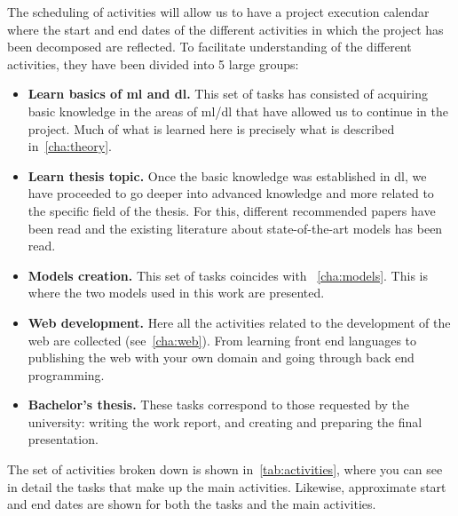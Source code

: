 The scheduling of activities will allow us to have a project execution calendar
where the start and end dates of the different activities in which the project
has been decomposed are reflected. To facilitate understanding of the different
activities, they have been divided into 5 large groups:
\begin{itemize}
  \item \textbf{Learn basics of \gls{ml} and \gls{dl}.} This set of tasks has
  consisted of acquiring basic knowledge in the areas of \gls{ml}/\gls{dl} that
  have allowed us to continue in the project. Much of what is learned here is
  precisely what is described in\ \vref{cha:theory}.
  \item \textbf{Learn thesis topic.} Once the basic knowledge was established
  in \gls{dl}, we have proceeded to go deeper into advanced knowledge and more
  related to the specific field of the thesis. For this, different recommended
  papers have been read and the existing literature about state-of-the-art
  models has been read.
  \item \textbf{Models creation.} This set of tasks coincides with
 \ \vref{cha:models}. This is where the two models used in this work are
  presented.
  \item \textbf{Web development.} Here all the activities related to the
  development of the web are collected (see\ \vref{cha:web}). From learning
  front end languages to publishing the web with your own domain and going
  through back end programming.
  \item \textbf{Bachelor's thesis.} These tasks correspond to those requested
  by the university: writing the work report, and creating and preparing the
  final presentation.
\end{itemize}

The set of activities broken down is shown in\ \vref{tab:activities}, where you
can see in detail the tasks that make up the main activities. Likewise,
approximate start and end dates are shown for both the tasks and the main
activities.

